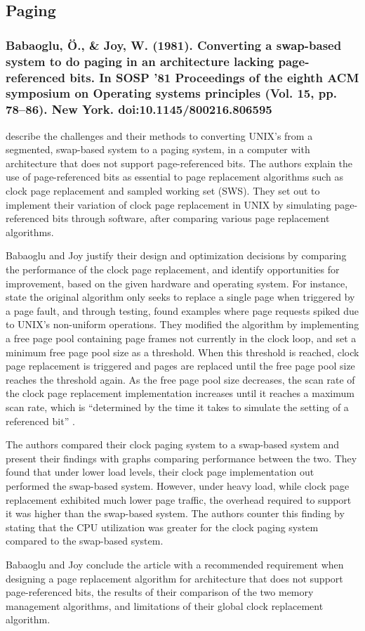 \subsection{Paging}

\subsubsection*{Babaoglu, Ö., \& Joy, W. (1981). Converting a swap-based system to do paging in an architecture lacking page-referenced bits. In SOSP ’81 Proceedings of the eighth ACM symposium on Operating systems principles (Vol. 15, pp. 78–86). New York. doi:10.1145/800216.806595}

\citet{Babaoglu1981} describe the challenges and their methods to converting UNIX's from a segmented, swap-based system to a paging system, in a computer with architecture that does not support page-referenced bits. The authors explain the use of page-referenced bits as essential to page replacement algorithms such as clock page replacement and sampled working set (SWS). They set out to implement their variation of clock page replacement in UNIX by simulating page-referenced bits through software, after comparing various page replacement algorithms.

Babaoglu and Joy justify their design and optimization decisions by comparing the performance of the clock page replacement, and identify opportunities for improvement, based on the given hardware and operating system. For instance, \citet[p. 80]{Babaoglu1981} state the original algorithm only seeks to replace a single page when triggered by a page fault, and through testing, found examples where page requests spiked due to UNIX's non-uniform operations. They modified the algorithm by implementing a free page pool containing page frames not currently in the clock loop, and set a minimum free page pool size as a threshold. When this threshold is reached, clock page replacement is triggered and pages are replaced until the free page pool size reaches the threshold again. As the free page pool size decreases, the scan rate of the clock page replacement implementation increases until it reaches a maximum scan rate, which is ``determined by the time it takes to simulate the setting of a referenced bit'' \citep[p. 80]{Babaoglu1981}.

The authors compared their clock paging system to a swap-based system and present their findings with graphs comparing performance between the two. They found that under lower load levels, their clock page implementation out performed the swap-based system. However, under heavy load, while clock page replacement exhibited much lower page traffic, the overhead required to support it was higher than the swap-based system. The authors counter this finding by stating that the CPU utilization was greater for the clock paging system compared to the swap-based system.

Babaoglu and Joy conclude the article with a recommended requirement when designing a page replacement algorithm for architecture that does not support page-referenced bits, the results of their comparison of the two memory management algorithms, and limitations of their global clock replacement algorithm.
